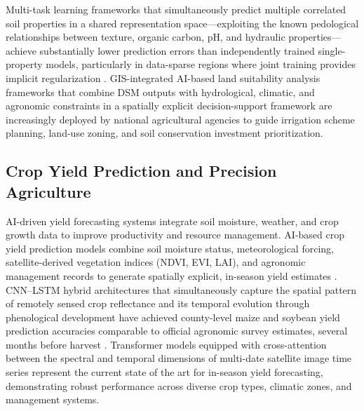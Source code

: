 \documentclass[land,review,accept,pdftex,oneauthor]{Definitions/mdpi}
\begin{document}
Multi-task learning frameworks that simultaneously predict multiple correlated soil properties in a shared representation space---exploiting the known pedological relationships between texture, organic carbon, pH, and hydraulic properties---achieve substantially lower prediction errors than independently trained single-property models, particularly in data-sparse regions where joint training provides implicit regularization {\citep{zhang2018deep,Lemenkova202403}}. GIS-integrated AI-based land suitability analysis frameworks that combine DSM outputs with hydrological, climatic, and agronomic constraints in a spatially explicit decision-support framework are increasingly deployed by national agricultural agencies to guide irrigation scheme planning, land-use zoning, and soil conservation investment prioritization.

\subsection{Crop Yield Prediction and Precision Agriculture}\label{sec5.6}

AI-driven yield forecasting systems integrate soil moisture, weather, and crop growth data to improve productivity and resource management. AI-based crop yield prediction models combine soil moisture status, meteorological forcing, satellite-derived vegetation indices (NDVI, EVI, LAI), and agronomic management records to generate spatially explicit, in-season yield estimates \citep{you2017deep}. CNN--LSTM hybrid architectures that simultaneously capture the spatial pattern of remotely sensed crop reflectance and its temporal evolution through phenological development have achieved county-level maize and soybean yield prediction accuracies comparable to official agronomic survey estimates, several months before harvest {\citep{you2017deep,Kratzert2018}}. Transformer models equipped with cross-attention between the spectral and temporal dimensions of multi-date satellite image time series represent the current state of the art for in-season yield forecasting, demonstrating robust performance across diverse crop types, climatic zones, and management systems.
\end{document}
